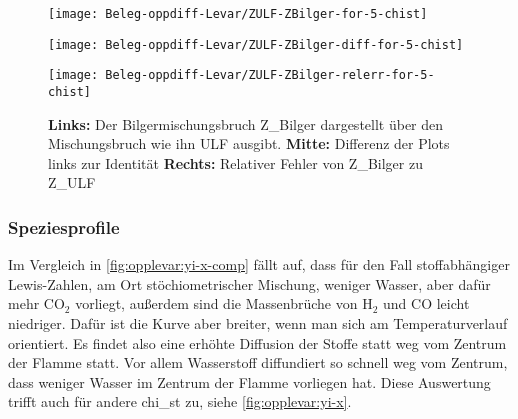 \begin{figure}[H]
    \begin{minipage}{0.33\linewidth}\begin{center}
        \texttt{[image: Beleg-oppdiff-Levar/ZULF-ZBilger-for-5-chist]}
    \end{center}\end{minipage}\begin{minipage}{0.33\linewidth}\begin{center}
        \texttt{[image: Beleg-oppdiff-Levar/ZULF-ZBilger-diff-for-5-chist]}
    \end{center}\end{minipage}\begin{minipage}{0.33\linewidth}\begin{center}
        \texttt{[image: Beleg-oppdiff-Levar/ZULF-ZBilger-relerr-for-5-chist]}
    \end{center}\end{minipage}
    \caption{
        \textbf{Links:} Der Bilgermischungsbruch \gls{Z_Bilger} dargestellt über den Mischungsbruch wie ihn \gls{ULF} ausgibt.
        \textbf{Mitte:} Differenz der Plots links zur Identität
        \textbf{Rechts:} Relativer Fehler von \gls{Z_Bilger} zu \gls{Z_ULF}
    }
    \label{fig:opplevar:zbilger-zcalc}
\end{figure}

\subsubsection{Speziesprofile}

Im Vergleich in \autoref{fig:opplevar:yi-x-comp} fällt auf, dass für den Fall stoffabhängiger Lewis-Zahlen, am Ort stöchiometrischer Mischung, weniger Wasser, aber dafür mehr $\mathrm{CO}_2$ vorliegt, außerdem sind die Massenbrüche von $\mathrm{H}_2$ und $\mathrm{CO}$ leicht niedriger. Dafür ist die Kurve aber breiter, wenn man sich am Temperaturverlauf orientiert. Es findet also eine erhöhte Diffusion der Stoffe statt weg vom Zentrum der Flamme statt. Vor allem Wasserstoff diffundiert so schnell weg vom Zentrum, dass weniger Wasser im Zentrum der Flamme vorliegen hat. Diese Auswertung trifft auch für andere \gls{chi_st} zu, siehe \autoref{fig:opplevar:yi-x}.

